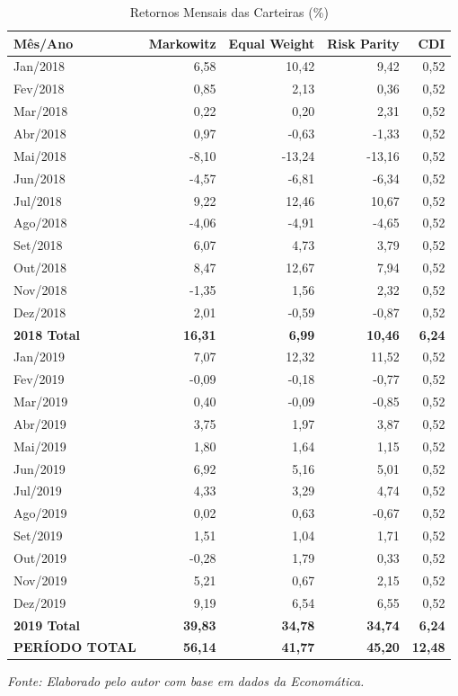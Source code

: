 \begin{table}[H]
\centering
\caption{Retornos Mensais das Carteiras (\%)}
\scriptsize
\begin{tabular}{|l|r|r|r|r|}
\hline
\textbf{Mês/Ano} & \textbf{Markowitz} & \textbf{Equal Weight} & \textbf{Risk Parity} & \textbf{CDI} \\
\hline
Jan/2018 & 6,58 & 10,42 & 9,42 & 0,52 \\
Fev/2018 & 0,85 & 2,13 & 0,36 & 0,52 \\
Mar/2018 & 0,22 & 0,20 & 2,31 & 0,52 \\
Abr/2018 & 0,97 & -0,63 & -1,33 & 0,52 \\
Mai/2018 & -8,10 & -13,24 & -13,16 & 0,52 \\
Jun/2018 & -4,57 & -6,81 & -6,34 & 0,52 \\
Jul/2018 & 9,22 & 12,46 & 10,67 & 0,52 \\
Ago/2018 & -4,06 & -4,91 & -4,65 & 0,52 \\
Set/2018 & 6,07 & 4,73 & 3,79 & 0,52 \\
Out/2018 & 8,47 & 12,67 & 7,94 & 0,52 \\
Nov/2018 & -1,35 & 1,56 & 2,32 & 0,52 \\
Dez/2018 & 2,01 & -0,59 & -0,87 & 0,52 \\
\hline
\textbf{2018 Total} & \textbf{16,31} & \textbf{6,99} & \textbf{10,46} & \textbf{6,24} \\
\hline
Jan/2019 & 7,07 & 12,32 & 11,52 & 0,52 \\
Fev/2019 & -0,09 & -0,18 & -0,77 & 0,52 \\
Mar/2019 & 0,40 & -0,09 & -0,85 & 0,52 \\
Abr/2019 & 3,75 & 1,97 & 3,87 & 0,52 \\
Mai/2019 & 1,80 & 1,64 & 1,15 & 0,52 \\
Jun/2019 & 6,92 & 5,16 & 5,01 & 0,52 \\
Jul/2019 & 4,33 & 3,29 & 4,74 & 0,52 \\
Ago/2019 & 0,02 & 0,63 & -0,67 & 0,52 \\
Set/2019 & 1,51 & 1,04 & 1,71 & 0,52 \\
Out/2019 & -0,28 & 1,79 & 0,33 & 0,52 \\
Nov/2019 & 5,21 & 0,67 & 2,15 & 0,52 \\
Dez/2019 & 9,19 & 6,54 & 6,55 & 0,52 \\
\hline
\textbf{2019 Total} & \textbf{39,83} & \textbf{34,78} & \textbf{34,74} & \textbf{6,24} \\
\hline
\textbf{PERÍODO TOTAL} & \textbf{56,14} & \textbf{41,77} & \textbf{45,20} & \textbf{12,48} \\
\hline
\end{tabular}
\normalsize
\textit{Fonte: Elaborado pelo autor com base em dados da Economática.}
\label{tab:monthly_returns}
\end{table}

